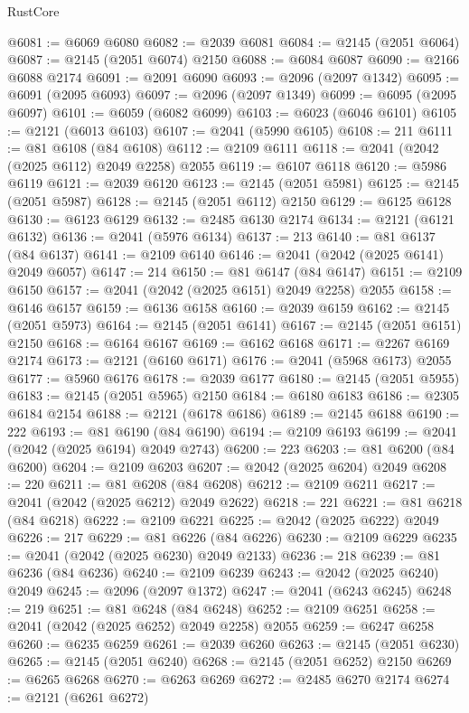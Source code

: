 \begin{lexlean}{RustCore}
\begin{coremodule}
@6081 := @6069 @6080
@6082 := @2039 @6081
@6084 := @2145 (@2051 @6064)
@6087 := @2145 (@2051 @6074) @2150
@6088 := @6084 @6087
@6090 := @2166 @6088 @2174
@6091 := @2091 @6090
@6093 := @2096 (@2097 @1342)
@6095 := @6091 (@2095 @6093)
@6097 := @2096 (@2097 @1349)
@6099 := @6095 (@2095 @6097)
@6101 := @6059 (@6082 @6099)
@6103 := @6023 (@6046 @6101)
@6105 := @2121 (@6013 @6103)
@6107 := @2041 (@5990 @6105)
@6108 := 211
@6111 := @81 @6108 (@84 @6108)
@6112 := @2109 @6111
@6118 := @2041 (@2042 (@2025 @6112) @2049 @2258) @2055
@6119 := @6107 @6118
@6120 := @5986 @6119
@6121 := @2039 @6120
@6123 := @2145 (@2051 @5981)
@6125 := @2145 (@2051 @5987)
@6128 := @2145 (@2051 @6112) @2150
@6129 := @6125 @6128
@6130 := @6123 @6129
@6132 := @2485 @6130 @2174
@6134 := @2121 (@6121 @6132)
@6136 := @2041 (@5976 @6134)
@6137 := 213
@6140 := @81 @6137 (@84 @6137)
@6141 := @2109 @6140
@6146 := @2041 (@2042 (@2025 @6141) @2049 @6057)
@6147 := 214
@6150 := @81 @6147 (@84 @6147)
@6151 := @2109 @6150
@6157 := @2041 (@2042 (@2025 @6151) @2049 @2258) @2055
@6158 := @6146 @6157
@6159 := @6136 @6158
@6160 := @2039 @6159
@6162 := @2145 (@2051 @5973)
@6164 := @2145 (@2051 @6141)
@6167 := @2145 (@2051 @6151) @2150
@6168 := @6164 @6167
@6169 := @6162 @6168
@6171 := @2267 @6169 @2174
@6173 := @2121 (@6160 @6171)
@6176 := @2041 (@5968 @6173) @2055
@6177 := @5960 @6176
@6178 := @2039 @6177
@6180 := @2145 (@2051 @5955)
@6183 := @2145 (@2051 @5965) @2150
@6184 := @6180 @6183
@6186 := @2305 @6184 @2154
@6188 := @2121 (@6178 @6186)
@6189 := @2145 @6188
@6190 := 222
@6193 := @81 @6190 (@84 @6190)
@6194 := @2109 @6193
@6199 := @2041 (@2042 (@2025 @6194) @2049 @2743)
@6200 := 223
@6203 := @81 @6200 (@84 @6200)
@6204 := @2109 @6203
@6207 := @2042 (@2025 @6204) @2049
@6208 := 220
@6211 := @81 @6208 (@84 @6208)
@6212 := @2109 @6211
@6217 := @2041 (@2042 (@2025 @6212) @2049 @2622)
@6218 := 221
@6221 := @81 @6218 (@84 @6218)
@6222 := @2109 @6221
@6225 := @2042 (@2025 @6222) @2049
@6226 := 217
@6229 := @81 @6226 (@84 @6226)
@6230 := @2109 @6229
@6235 := @2041 (@2042 (@2025 @6230) @2049 @2133)
@6236 := 218
@6239 := @81 @6236 (@84 @6236)
@6240 := @2109 @6239
@6243 := @2042 (@2025 @6240) @2049
@6245 := @2096 (@2097 @1372)
@6247 := @2041 (@6243 @6245)
@6248 := 219
@6251 := @81 @6248 (@84 @6248)
@6252 := @2109 @6251
@6258 := @2041 (@2042 (@2025 @6252) @2049 @2258) @2055
@6259 := @6247 @6258
@6260 := @6235 @6259
@6261 := @2039 @6260
@6263 := @2145 (@2051 @6230)
@6265 := @2145 (@2051 @6240)
@6268 := @2145 (@2051 @6252) @2150
@6269 := @6265 @6268
@6270 := @6263 @6269
@6272 := @2485 @6270 @2174
@6274 := @2121 (@6261 @6272)

\end{coremodule}
\end{lexlean}
